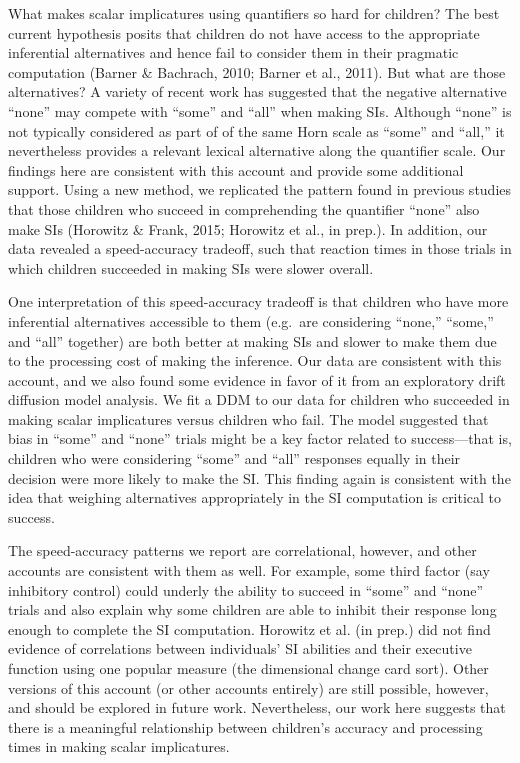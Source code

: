 \documentclass[10pt, letterpaper]{article}
\begin{document}
What makes scalar implicatures using quantifiers so hard for children?
The best current hypothesis posits that children do not have access to
the appropriate inferential alternatives and hence fail to consider them
in their pragmatic computation (Barner \& Bachrach, 2010; Barner et al.,
2011). But what are those alternatives? A variety of recent work has
suggested that the negative alternative ``none'' may compete with
``some'' and ``all'' when making SIs. Although ``none'' is not typically
considered as part of of the same Horn scale as ``some'' and ``all,'' it
nevertheless provides a relevant lexical alternative along the
quantifier scale. Our findings here are consistent with this account and
provide some additional support. Using a new method, we replicated the
pattern found in previous studies that those children who succeed in
comprehending the quantifier ``none'' also make SIs (Horowitz \& Frank,
2015; Horowitz et al., in prep.). In addition, our data revealed a
speed-accuracy tradeoff, such that reaction times in those trials in
which children succeeded in making SIs were slower overall.

One interpretation of this speed-accuracy tradeoff is that children who
have more inferential alternatives accessible to them (e.g.~are
considering ``none,'' ``some,'' and ``all'' together) are both better at
making SIs and slower to make them due to the processing cost of making
the inference. Our data are consistent with this account, and we also
found some evidence in favor of it from an exploratory drift diffusion
model analysis. We fit a DDM to our data for children who succeeded in
making scalar implicatures versus children who fail. The model suggested
that bias in ``some'' and ``none'' trials might be a key factor related
to success---that is, children who were considering ``some'' and ``all''
responses equally in their decision were more likely to make the SI.
This finding again is consistent with the idea that weighing
alternatives appropriately in the SI computation is critical to success.

The speed-accuracy patterns we report are correlational, however, and
other accounts are consistent with them as well. For example, some third
factor (say inhibitory control) could underly the ability to succeed in
``some'' and ``none'' trials and also explain why some children are able
to inhibit their response long enough to complete the SI computation.
Horowitz et al. (in prep.) did not find evidence of correlations between
individuals' SI abilities and their executive function using one popular
measure (the dimensional change card sort). Other versions of this
account (or other accounts entirely) are still possible, however, and
should be explored in future work. Nevertheless, our work here suggests
that there is a meaningful relationship between children's accuracy and
processing times in making scalar implicatures.
\end{document}
